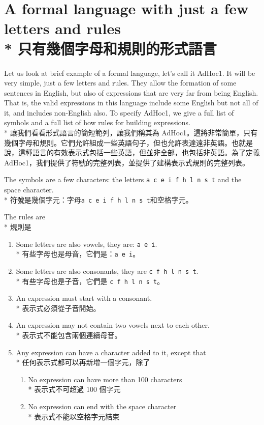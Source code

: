 \documentclass[]{article}
\begin{document}
\section*{{\color{gray}A formal language with just a few letters and rules}
\\*
{只有幾個字母和規則的形式語言}}

{\color{gray}Let us look at brief example of a formal language, let's call it AdHoc1. It will be very simple, just a few letters and rules. They allow the formation of some sentences in English, but also of expressions that are very far from being English. That is, the valid expressions in this language include some English but not all of it, and includes non-English also. To specify AdHoc1, we give a full list of symbols and a full list of how rules for building expressions.}
\\*
{讓我們看看形式語言的簡短範列，讓我們稱其為 AdHoc1。這將非常簡單，只有幾個字母和規則。它們允許組成一些英語句子，但也允許表達遠非英語。也就是說，這種語言的有效表示式包括一些英語，但並非全部，也包括非英語。為了定義 AdHoc1，我們提供了符號的完整列表，並提供了建構表示式規則的完整列表。}

{\color{gray}The symbols are a few characters: the letters {\tt a c e i f h l n s t} and the space character.}
\\*
{符號是幾個字元：字母{\tt a c e i f h l n s t}和空格字元。}

{\color{gray}The rules are}
\\*
{規則是}
\begin{enumerate}
	\item {\color{gray}Some letters are also vowels, they are: {\tt a e i}.}
	\\*
	{有些字母也是母音，它們是：{\tt a e i}。}
	\item {\color{gray}Some letters are also consonants, they are {\tt c f h l n s t}.}
	\\*
	{有些字母也是子音，它們是 {\tt c f h l n s t}。}
	\item {\color{gray}An expression must start with a consonant.}
	\\*
	{表示式必須從子音開始。}
	\item {\color{gray}An expression may not contain two vowels next to each other.}
	\\*
	{表示式不能包含兩個連續母音。}
	\item {\color{gray}Any expression can have a character added to it, except that}
	\\*
	{任何表示式都可以再新增一個字元，除了}
		\begin{enumerate}
			\item {\color{gray}No expression can have more than 100 characters}
			\\*
			{表示式不可超過 100 個字元}
			\item {\color{gray}No expression can end with the space character}
			\\*
			{表示式不能以空格字元結束}
		\end{enumerate}
\end{enumerate}
\end{document}
